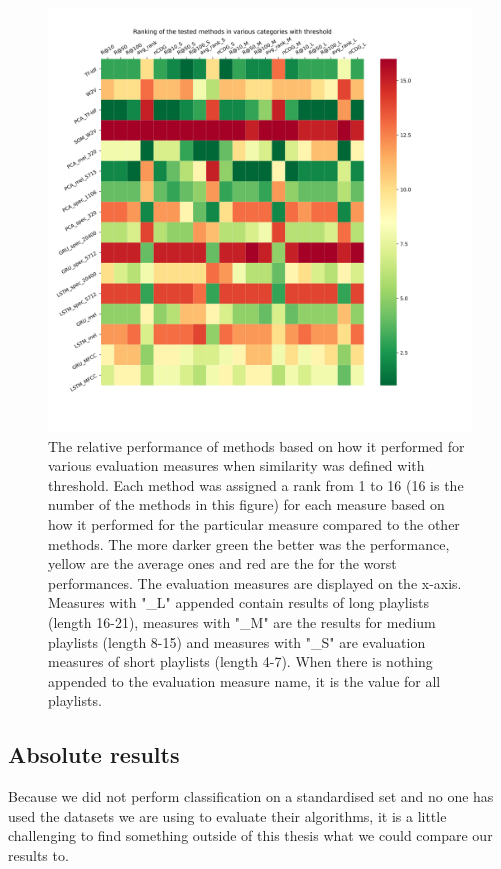 \begin{figure}[h]
    \centering
	\includegraphics[width=1\linewidth]{./img/threshold_method_ranking.png}
	\caption[Method performance comparison heat map with threshold applied]{The relative performance of methods based on how it performed for various evaluation measures when similarity was defined with threshold. Each method was assigned a rank from 1 to 16 (16 is the number of the methods in this figure) for each measure based on how it performed for the particular measure compared to the other methods. The more darker green the better was the performance, yellow are the average ones and red are the for the worst performances. The evaluation measures are displayed on the x-axis. Measures with "\_L" appended contain results of long playlists (length 16-21), measures with "\_M" are the results for medium playlists (length 8-15) and measures with "\_S" are evaluation measures of short playlists (length 4-7). When there is nothing appended to the evaluation measure name, it is the value for all playlists.}
	\label{fig:threshold_method_comparison}
\end{figure}

\subsection{Absolute results}\label{ssec:absolute_results}
Because we did not perform classification on a standardised set and no one has used the datasets we are using to evaluate their algorithms, it is a little challenging to find something outside of this thesis what we could compare our results to.

